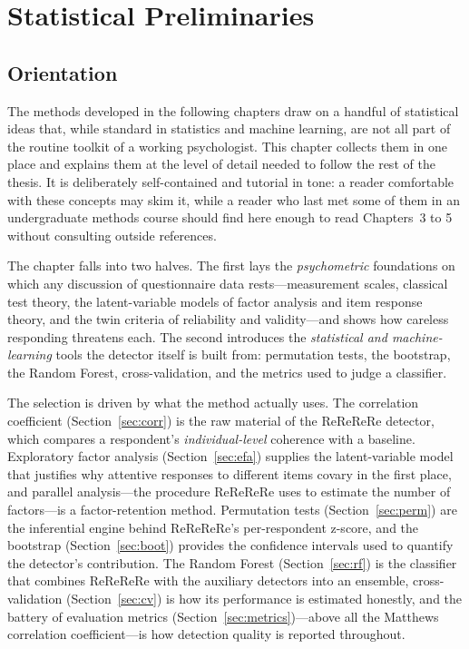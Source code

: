 \chapter{Statistical Preliminaries}
\label{ch:stats}

\section{Orientation}

The methods developed in the following chapters draw on a handful of
statistical ideas that, while standard in statistics and machine learning, are
not all part of the routine toolkit of a working psychologist. This chapter
collects them in one place and explains them at the level of detail needed to
follow the rest of the thesis. It is deliberately self-contained and tutorial in
tone: a reader comfortable with these concepts may skim it, while a reader who
last met some of them in an undergraduate methods course should find here
enough to read Chapters~3 to 5 without consulting outside references.

The chapter falls into two halves. The first lays the \emph{psychometric}
foundations on which any discussion of questionnaire data rests---measurement
scales, classical test theory, the latent-variable models of factor analysis
and item response theory, and the twin criteria of reliability and
validity---and shows how careless responding threatens each. The second
introduces the \emph{statistical and machine-learning} tools the detector
itself is built from: permutation tests, the bootstrap, the Random Forest,
cross-validation, and the metrics used to judge a classifier.

The selection is driven by what the method actually uses. The
correlation coefficient (Section~\ref{sec:corr}) is the raw material of the
ReReReRe detector, which compares a respondent's \emph{individual-level}
coherence with a baseline. Exploratory factor analysis
(Section~\ref{sec:efa}) supplies the latent-variable model that justifies why
attentive responses to different items covary in the first place, and parallel
analysis---the procedure ReReReRe uses to estimate the number of factors---is a
factor-retention method. Permutation tests (Section~\ref{sec:perm}) are the
inferential engine behind ReReReRe's per-respondent z-score, and the bootstrap
(Section~\ref{sec:boot}) provides the confidence intervals used to quantify the
detector's contribution. The Random Forest (Section~\ref{sec:rf}) is the
classifier that combines ReReReRe with the auxiliary detectors into an
ensemble, cross-validation (Section~\ref{sec:cv}) is how its performance is
estimated honestly, and the battery of evaluation metrics
(Section~\ref{sec:metrics})---above all the Matthews correlation
coefficient---is how detection quality is reported throughout.

